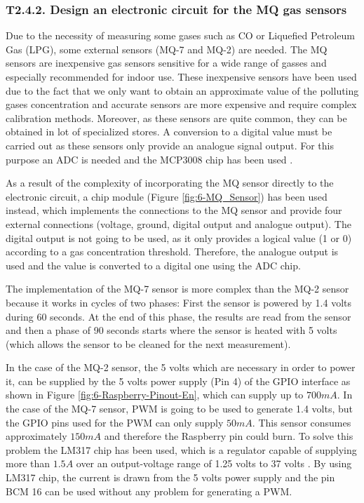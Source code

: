 \subsubsection{T2.4.2. Design an electronic circuit for the MQ gas sensors}
Due to the necessity of measuring some gases such as CO or Liquefied Petroleum Gas (LPG), some external sensors (MQ-7 and MQ-2) are needed. The MQ sensors are inexpensive gas sensors sensitive for a wide range of gasses and especially recommended for indoor use. These inexpensive sensors have been used due to the fact that we only want to obtain an approximate value of the polluting gases concentration and accurate sensors are more expensive and require complex calibration methods. Moreover, as these sensors are quite common, they can be obtained in lot of specialized stores. A conversion to a digital value must be carried out as these sensors only provide an analogue signal output. For this purpose an \ac{ADC} is needed and the MCP3008 chip has been used \cite{MCP3008}.

As a result of the complexity of incorporating the MQ sensor directly to the electronic circuit, a chip module (Figure \ref{fig:6-MQ_Sensor}) has been used instead, which implements the connections to the MQ sensor and provide four external connections (voltage, ground, digital output and analogue output). The digital output is not going to be used, as it only provides a logical value (1 or 0) according to a gas concentration threshold. Therefore, the analogue output is used and the value is converted to a digital one using the \ac{ADC} chip.


The implementation of the MQ-7 sensor is more complex than the MQ-2 sensor because it works in cycles of two phases: First the sensor is powered by 1.4 volts during 60 seconds. At the end of this phase, the results are read from the sensor and then a phase of 90 seconds starts where the sensor is heated with 5 volts (which allows the sensor to be cleaned for the next measurement). 

In the case of the MQ-2 sensor, the 5 volts which are necessary in order to power it, can be supplied by the 5 volts power supply (Pin 4) of the GPIO interface as shown in Figure \ref{fig:6-Raspberry-Pinout-En}, which can supply up to $700mA$. In the case of the MQ-7 sensor, \ac{PWM} is going to be used to generate 1.4 volts, but the GPIO pins used for the \ac{PWM} can only supply $50mA$. This sensor consumes approximately $150mA$ and therefore the Raspberry pin could burn. To solve this problem the LM317 chip has been used, which is a regulator capable of supplying more than $1.5A$ over an output-voltage range of 1.25 volts to 37 volts \cite{LM317}. By using LM317 chip, the current is drawn from the 5 volts power supply and the pin BCM 16 can be used without any problem for generating a \ac{PWM}.

